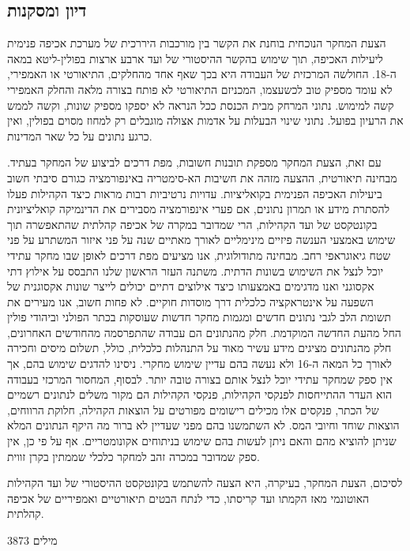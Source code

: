 \subsection{דיון ומסקנות}
הצעת המחקר הנוכחית בוחנת את הקשר בין מורכבות היררכית של מערכת אכיפה פנימית ליעילות האכיפה, תוך שימוש בהקשר ההיסטורי של ועד ארבע ארצות בפולין-ליטא במאה ה-18. החולשה המרכזית של העבודה היא בכך שאף אחד מהחלקים, התיאורטי או האמפירי, לא עומד מספיק טוב לכשעצמו, המכניזם התיאורטי לא פותח בצורה מלאה והחלק האמפירי קשה למימוש. נתוני המרחק מבית הכנסת ככל הנראה לא יספקו מספיק שונות, וקשה לממש את הרעיון בפועל. נתוני שינוי הבעלות על אדמות אצולה מוגבלים רק למחוז מסוים בפולין, ואין כרגע נתונים על כל שאר המדינות.

עם זאת, הצעת המחקר מספקת תובנות חשובות, מפת דרכים לביצוע של המחקר בעתיד. מבחינה תיאורטית, ההצעה מזהה את חשיבות הא-סימטריה באינפורמציה כגורם סיבתי חשוב ביעילות האכיפה הפנימית בקואליציות. עדויות נרטיביות רבות מראות כיצד הקהילות פעלו להסתרת מידע או תמרון נתונים, אם פערי אינפורמציה מסבירים את הדינמיקה קואליציונית בקונטקסט של ועד הקהילות, הרי שמדובר במקרה של אכיפה קהלתית שהתאפשרה תוך שימוש באמצעי הענשה פיזיים מינימליים לאורך מאתיים שנה על פני איזור המשתרע על פני שטח גיאוגראפי רחב.
מבחינה מתודולוגית, אנו מציעים מפת דרכים לאופן שבו מחקר עתידי יוכל לנצל את השימוש בשונות הדתית. משתנה העזר הראשון שלנו התבסס על אילוץ דתי אקסוגני ואנו מדגימים באמצעותו כיצד אילוצים דתיים יכולים לייצר שונות אקסוגנית של השפעה על אינטראקציה כלכלית דרך מוסדות חוקיים. 
לא פחות חשוב, אנו מעירים את תשומת הלב לגבי נתונים חדשים ומגמות מחקר חדשות שעוסקות בכתר הפולני וביהודי פולין החל מהעת החדשה המוקדמת. חלק מהנתונים הם עבודה שהתפרסמה מהחודשים האחרונים, חלק מהנתונים מציגים מידע עשיר מאוד על התנהלות כלכלית, כולל, תשלום מיסים וחכירה לאורך כל המאה ה-16 ולא נעשה בהם עדיין שימוש מחקרי. ניסינו להדגים שימוש בהם, אך אין ספק שמחקר עתידי יוכל לנצל אותם בצורה טובה יותר. 
לבסוף, המחסור המרכזי בעבודה הוא העדר ההתייחסות לפנקסי הקהילות, פנקסי הקהילות הם מקור משלים לנתונים רשמיים של הכתר, פנקסים אלו מכילים רישומים מפורטים על הוצאות הקהילה, חלוקת הרווחים, הוצאות שוחד וחיובי המס. לא השתמשנו בהם מפני שעדיין לא ברור מה היקף הנתונים המלא שניתן להוציא מהם והאם ניתן לעשות בהם שימוש בניתוחים אקונומטריים. אף על פי כן, אין ספק שמדובר במכרה זהב למחקר כלכלי שממתין בקרן זווית.

לסיכום, הצעת המחקר, בעיקרה, היא הצעה להשתמש בקונטקסט ההיסטורי של ועד הקהילות האוטונמי מאז הקמתו ועד קריסתו, כדי לנתח הבטים תיאורטיים ואמפיריים של אכיפה קהלתית.

3873 מילים